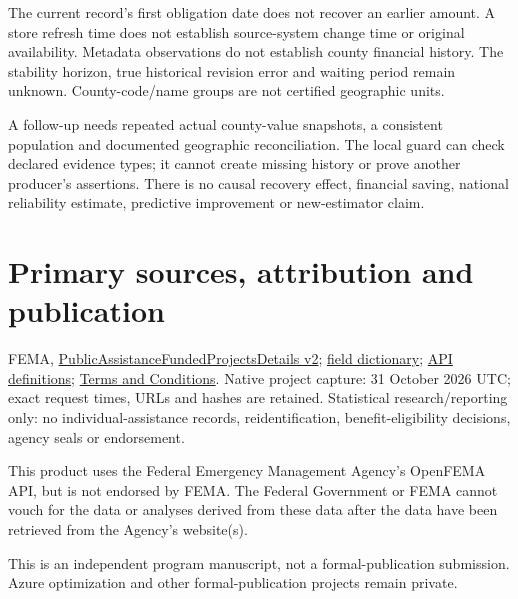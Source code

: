 \documentclass[11pt,letterpaper]{article}
\begin{document}
The current record's first obligation date does not recover an earlier amount. A store refresh time does not establish source-system change time or original availability. Metadata observations do not establish county financial history. The stability horizon, true historical revision error and waiting period remain unknown. County-code/name groups are not certified geographic units.

A follow-up needs repeated actual county-value snapshots, a consistent population and documented geographic reconciliation. The local guard can check declared evidence types; it cannot create missing history or prove another producer's assertions. There is no causal recovery effect, financial saving, national reliability estimate, predictive improvement or new-estimator claim.

\section*{Primary sources, attribution and publication}
{\small
FEMA, \href{https://www.fema.gov/api/open/v2/PublicAssistanceFundedProjectsDetails}{PublicAssistanceFundedProjectsDetails v2};
\href{https://www.fema.gov/openfema-data-page/public-assistance-funded-projects-details-v2}{field dictionary};
\href{https://www.fema.gov/about/openfema/api}{API definitions};
\href{https://www.fema.gov/about/openfema/terms-conditions}{Terms and Conditions}.
Native project capture: 31 October 2026 UTC; exact request times, URLs and hashes are retained. Statistical research/reporting only: no individual-assistance records, reidentification, benefit-eligibility decisions, agency seals or endorsement.

This product uses the Federal Emergency Management Agency's OpenFEMA API, but is not endorsed by FEMA. The Federal Government or FEMA cannot vouch for the data or analyses derived from these data after the data have been retrieved from the Agency's website(s).

This is an independent program manuscript, not a formal-publication submission. Azure optimization and other formal-publication projects remain private.
}
\end{document}
